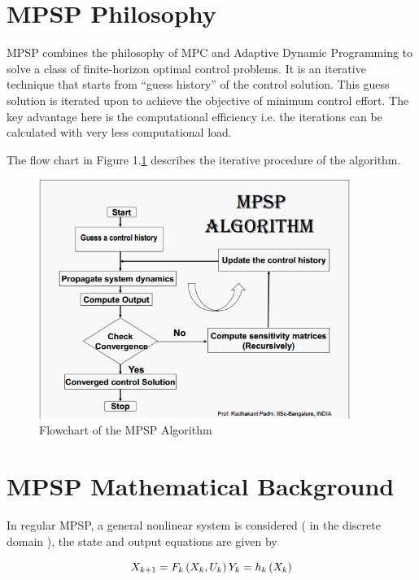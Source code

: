 \documentclass[12pt]{article}
\begin{document}
\section{MPSP Philosophy}
MPSP combines the philosophy of MPC and Adaptive Dynamic Programming to solve a class of finite-horizon optimal control problems. It is an iterative technique that starts from “guess history” of the control solution. This guess solution is iterated upon to achieve the objective of minimum control effort. The key advantage here is the computational efficiency i.e. the iterations can be calculated with very less computational load. 

The flow chart in Figure 1.\ref{fig:MPSPFlowchart} describes the iterative procedure of the algorithm.


\begin{figure}[h]
    \centering
    \includegraphics[width=0.9\textwidth]{img/MPSPFlowchart.png}
    \caption{Flowchart of the MPSP Algorithm}
    \label{fig:MPSPFlowchart}
\end{figure}


\section{MPSP Mathematical Background}

In regular MPSP, a general nonlinear system is considered ( in the discrete domain ), the state and output equations are given by

\begin{equation}
X_{k+1}=F_{k}\left(X_{k}, U_{k}\right) \\
Y_{k}=h_{k}\left(X_{k}\right)
\end{equation}
\end{document}
